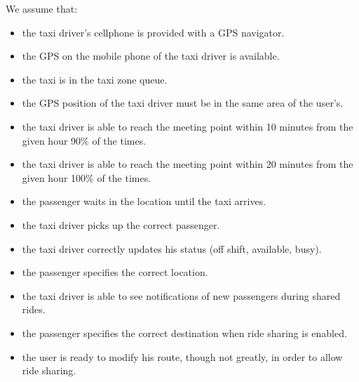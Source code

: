 We assume that:
\begin{itemize}
\item the taxi driver's cellphone is provided with a GPS navigator.
\item the GPS on the mobile phone of the taxi driver is available.
\item the taxi is in the taxi zone queue.
\item the GPS position of the taxi driver must be in the same area of the user's.
\item the taxi driver is able to reach the meeting point within 10 minutes from the given hour 90\% of the times.
\item the taxi driver is able to reach the meeting point within 20 minutes from the given hour 100\% of the times.
\item the passenger waits in the location until the taxi arrives.
\item the taxi driver picks up the correct passenger.
\item the taxi driver correctly updates his status (off shift, available, busy).
\item the passenger specifies the correct location.
\item the taxi driver is able to see notifications of new passengers during shared rides.
\item the passenger specifies the correct destination when ride sharing is enabled.
\item the user is ready to modify his route, though not greatly, in order to allow ride sharing.
\end{itemize}
